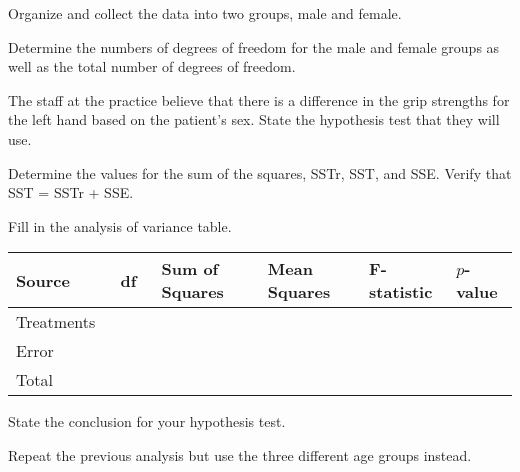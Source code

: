 \begin{problem}
  \item Organize and collect the data into two groups, male and
    female. 
    \vfill

  \item Determine the numbers of degrees of freedom for the male and
    female groups as well as the total number of degrees of freedom.

    \vspace{5em}

  \item The staff at the practice believe that there is a difference
    in the grip strengths for the left hand based on the patient's
    sex. State the hypothesis test that they will use.

    \vfill

    \clearpage
    
  \item Determine the values for the sum of the squares, SSTr, SST,
    and SSE.  Verify that SST = SSTr + SSE.

    \vfill

  \item Fill in the analysis of variance table. 

    \begin{tabular}{|l|l|l|l|l|l|} \hline
      Source & ~df~ & Sum of Squares & Mean Squares & F-statistic & $p$-value \\ \hline
      Treatments & & & & & \\ \hline
      Error & & & & \cellcolor{black!75} &  \cellcolor{black!75} \\ \hline
      Total & & & \cellcolor{black!75} & \cellcolor{black!75} & \cellcolor{black!75}  \\ \hline
    \end{tabular}

  \item State the conclusion for your hypothesis test.

    \vspace{5em}

    \clearpage

  \item Repeat the previous analysis but use the three different age groups instead.

    \clearpage
    

\end{problem}



